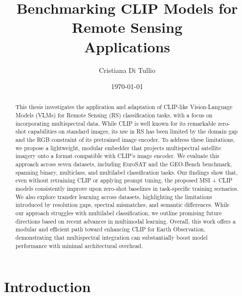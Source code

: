 \documentclass[a4paper, twoside, english]{sapthesis} %
\title{Benchmarking CLIP Models for Remote Sensing \\Applications}
\author{Cristiana Di Tullio}
\date{\today}
\begin{document}
\frontmatter
\maketitle


\begin{abstract}
    This thesis investigates the application and adaptation of CLIP-like Vision-Language Models (VLMs) for Remote Sensing (RS) classification tasks, with a focus on incorporating multispectral data. While CLIP is well known for its remarkable zero-shot capabilities on standard images, its use in RS has been limited by the domain gap and the RGB constraint of its pretrained image encoder. To address these limitations, we propose a lightweight, modular embedder that projects multispectral satellite imagery onto a format compatible with CLIP’s image encoder. We evaluate this approach across seven datasets, including EuroSAT and the GEO-Bench benchmark, spanning binary, multiclass, and multilabel classification tasks. Our findings show that, even without retraining CLIP or applying prompt tuning, the proposed MSI + CLIP models consistently improve upon zero-shot baselines in task-specific training scenarios. We also explore transfer learning across datasets, highlighting the limitations introduced by resolution gaps, spectral mismatches, and semantic differences. While our approach struggles with multilabel classification, we outline promising future directions based on recent advances in multimodal learning. Overall, this work offers a modular and efficient path toward enhancing CLIP for Earth Observation, demonstrating that multispectral integration can substantially boost model performance with minimal architectural overhead.
\end{abstract}

\tableofcontents

\mainmatter

\chapter{Introduction} %
\end{document}
